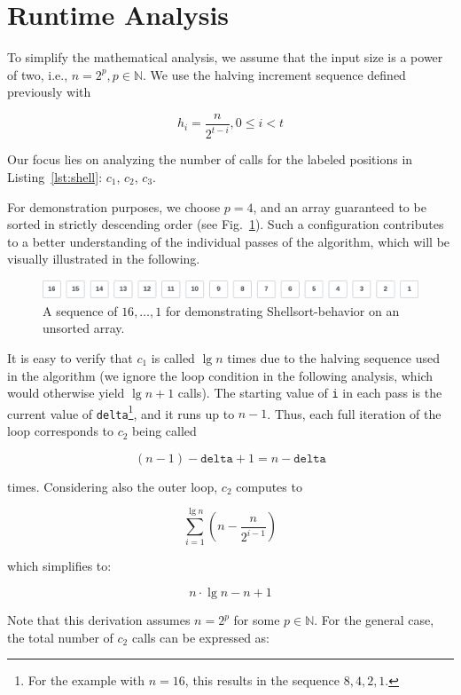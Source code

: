 \usepackage{caption}\section{Runtime Analysis}

To simplify the mathematical analysis, we assume that the input size is a power of two, i.e., $n = 2^p, p \in \mathbb{N}$.
We use the halving increment sequence defined previously with

\[
    h_i = \frac{n}{2^{t-i}}, 0 \leq i < t
\]

\noindent
Our focus lies on analyzing the number of calls for the labeled positions in Listing~\ref{lst:shell}: $c_1$, $c_2$, $c_3$.

For demonstration purposes, we choose $p=4$, and an array guaranteed to be sorted in strictly descending order (see Fig.~\ref{fig:bestcase}).
Such a configuration contributes to a better understanding of the individual passes of the algorithm, which will be visually illustrated in the following.
\begin{figure}[!h]
    \centering
    \includegraphics[width=1\columnwidth]{img/bestcase-sequence}
    \caption{A sequence of $16, \ldots, 1$ for demonstrating Shellsort-behavior on an unsorted array.}
    \label{fig:bestcase}
\end{figure}
It is easy to verify that $c_1$ is called $\lg n$ times due to the halving sequence used in the algorithm (we ignore the loop condition in the following analysis, which would otherwise yield $\lg n + 1$ calls).
The starting value of \texttt{i} in each pass is the current value of \texttt{delta}\footnote{
For the example with $n = 16$, this results in the sequence $8, 4, 2, 1$.
}, and it runs up to $n - 1$.
Thus, each full iteration of the loop corresponds to $c_2$ being called

\[
(n - 1) - \texttt{delta} + 1 = n - \texttt{delta}
\]

\noindent
times.
Considering also the outer loop, $c_2$ computes to

\[
\sum_{i=1}^{\lg n} \left( n - \frac{n}{2^{i-1}} \right)
\]

\noindent
which simplifies to:

\[
n \cdot \lg n - n + 1
\]

\noindent
Note that this derivation assumes $n = 2^p$ for some $p \in \mathbb{N}$.
For the general case, the total number of $c_2$ calls can be expressed as:

